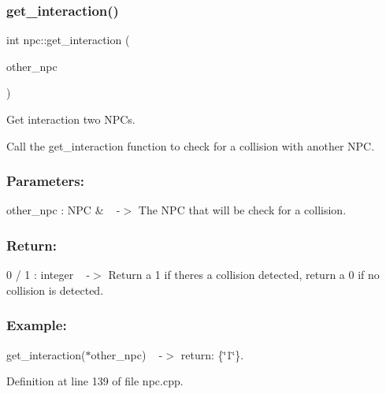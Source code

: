 \subsubsection{\texorpdfstring{get\+\_\+interaction()}{get\_interaction()}}
{\footnotesize\ttfamily int npc\+::get\+\_\+interaction (\begin{DoxyParamCaption}\item[{\hyperlink{classnpc}{npc} \&}]{other\+\_\+npc }\end{DoxyParamCaption})}



Get interaction two N\+PC\textquotesingle{}s. 

Call the \textquotesingle{}get\+\_\+interaction\textquotesingle{} function to check for a collision with another N\+PC.

\subsubsection*{Parameters\+: }

other\+\_\+npc \+: N\+PC \& ~\newline
-\/$>$ The N\+PC that will be check for a collision.

\subsubsection*{Return\+: }

0 / 1 \+: integer ~\newline
-\/$>$ Return a 1 if there\textquotesingle{}s a collision detected, return a 0 if no collision is detected.

\subsubsection*{Example\+: }

get\+\_\+interaction($\ast$other\+\_\+npc) ~\newline
-\/$>$ return\+: \{\char`\"{}1\char`\"{}\}. 

Definition at line 139 of file npc.\+cpp.

